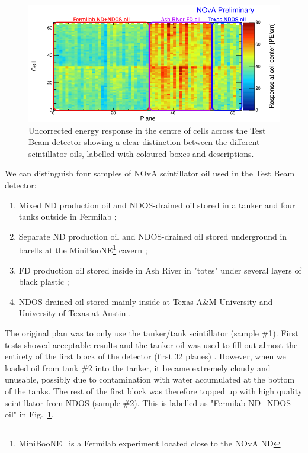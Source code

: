 \begin{figure}[!ht]
\centering
\includegraphics[width=\textwidth]{Plots/TBCalibration/TestBeamScintillatorOils.png}
\caption[Scintillator oils used in the Test Beam detector]{Uncorrected energy response in the centre of cells across the Test Beam detector showing a clear distinction between the different scintillator oils, labelled with coloured boxes and descriptions.}
\label{fig:Scintillators}
\end{figure}

We can distinguish four samples of \gls{NOvA} scintillator oil used in the Test Beam detector:
\begin{enumerate}
\item Mixed \gls{ND} production oil and \gls{NDOS}-drained oil stored in a tanker and four tanks outside in \gls{Fermilab} \cite{NOvA-doc-38349};
\item Separate \gls{ND} production oil and \gls{NDOS}-drained oil stored underground in barells at the MiniBooNE\footnote{MiniBooNE~\cite{MiniBooNEWebsite} is a \gls{Fermilab} experiment located close to the \gls{NOvA} \gls{ND}} cavern \cite{NOvA-doc-33012};
\item \gls{FD} production oil stored inside in Ash River in "totes" under several layers of black plastic \cite{NOvA-doc-34067};
\item \gls{NDOS}-drained oil stored mainly inside at Texas A\&M University and University of Texas at Austin \cite{NOvA-doc-38740, NOvA-doc-39088}.
\end{enumerate}


The original plan \cite{NOvA-doc-34196} was to only use the tanker/tank scintillator (sample \#1). First tests showed acceptable results and the tanker oil was used to fill out almost the entirety of the first block of the detector (first 32 planes) \cite{NOvA-doc-38349}. However, when we loaded oil from tank \#2 into the tanker, it became extremely cloudy and unusable, possibly due to contamination with water accumulated at the bottom of the tanks. The rest of the first block was therefore topped up with high quality scintillator from \gls{NDOS} (sample \#2). This is labelled as "\gls{Fermilab} \gls{ND}+\gls{NDOS} oil" in Fig.~\ref{fig:Scintillators}.

